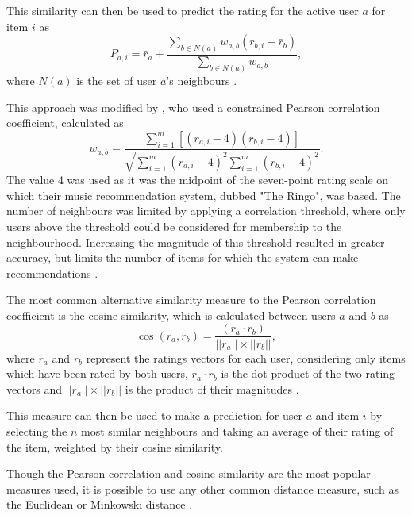 This similarity can then be used to predict the rating for the active user $a$ for item $i$ as
\begin{equation}
    P_{a,i} = \bar{r}_a + \dfrac{\sum\limits_{b \in N(a)}w_{a,b}(r_{b,i}-\bar{r}_b)}{\sum\limits_{b \in N(a)}w_{a,b}},
\end{equation}
where $N(a)$ is the set of user $a$'s neighbours \parencite{herlocker2002empirical}.

This approach was modified by \cite{shardanand1995social}, who used a constrained Pearson correlation coefficient, calculated as
\begin{equation}
    w_{a,b} = \dfrac{\sum\limits_{i=1}^{m}[(r_{a,i}-4)(r_{b,i}-4)]}{\sqrt{\sum\limits_{i=1}^{m}(r_{a,i}-4)^2\sum\limits_{i=1}^{m}(r_{b,i}-4)^2}}.
\end{equation}
The value 4 was used as it was the midpoint of the seven-point rating scale on which their music recommendation system, dubbed "The Ringo", was based. The number of neighbours was limited by applying a correlation threshold, where only users above the threshold could be considered for membership to the neighbourhood. Increasing the magnitude of this threshold resulted in greater accuracy, but limits the number of items for which the system can make recommendations \parencite{herlocker2002empirical}.

The most common alternative similarity measure to the Pearson correlation coefficient is the cosine similarity, which is calculated between users $a$ and $b$ as
\begin{equation}
    \cos(r_a,r_b) = \dfrac{(r_a\cdot r_b)}{||r_a||\times||r_b||},
\end{equation}
where $r_a$ and $r_b$ represent the ratings vectors for each user, considering only items which have been rated by both users, $r_a\cdot r_b$ is the dot product of the two rating vectors and $||r_a||\times||r_b||$ is the product of their magnitudes \parencite{handbook_ch2}.

This measure can then be used to make a prediction for user $a$ and item $i$ by selecting the $n$ most similar neighbours and taking an average of their rating of the item, weighted by their cosine similarity.

Though the Pearson correlation and cosine similarity are the most popular measures used, it is possible to use any other common distance measure, such as the Euclidean or Minkowski distance \parencite{handbook_ch2}.

